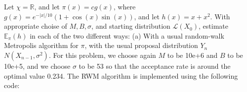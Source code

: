 
Let $\chi = \mathbb{R}$, and let $\pi(x)=cg(x)$, where $g(x)=e^{-|x|/10}(1+\cos(x)\sin(x))$, and let $h(x)=x+x^2$. With appropriate choise of $M,B, \sigma$, and starting distribution $\mathcal{L}(X_0)$, estimate $\mathbb{E}_\pi(h)$ in each of the two different ways:
(a) With a usual random-walk Metropolis algorithm for $\pi$, with the usual proposal distribution $Y_n$~$N(X_{n-1},\sigma^2)$.
For this problem, we choose again $M$ to be 10e+6 and $B$ to be 10e+5, and we choose $\sigma$ to be 53 so that the acceptance rate is around the optimal value 0.234.
The RWM algorithm is implemented using the following code:
\begin{knitrout}
\color{fgcolor}\begin{kframe}
\begin{alltt}

 \hlkwb{=} \hlstd{(}\hlopt{+}\hlopt{^}\hlstd{\}}
 \hlkwb{=} \hlstd{(}\hlstd{) \{}\hlstd{(}\hlopt{-}\hlopt{/}\hlstd{)}\hlopt{*}\hlstd{(}\hlopt{+}\hlopt{*}\hlopt{^}\hlstd{))\}}

 \hlkwb{=} 
 \hlkwb{=} 
 \hlkwb{=} 

 \hlkwb{=} \hlopt{+}
 \hlkwb{=} \hlopt{+}
 \hlkwb{=} \hlstd{(}\hlstd{,}
 \hlkwb{=} 

   \hlopt{:}\hlopt{+}
   \hlkwb{=} \hlstd{(}\hlstd{,}

   \hlstd{(}\hlstd{(}\hlstd{)}\hlopt{<=}\hlopt{+}\hlopt{/}
     \hlopt{>}
      \hlkwb{=}\hlopt{+}
     \hlkwb{=} \hlopt{+}
  \hlstd{\}}
   \hlkwb{=} 
   \hlkwb{=} 
\hlstd{\}}


\end{alltt}
\end{kframe}
\end{knitrout}
